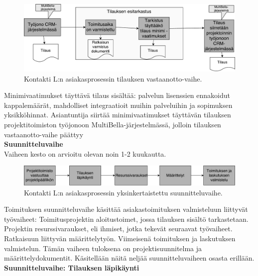 \documentclass[finnish,12pt,a4paper,pdftex]{article}
\begin{document}
\begin{figure}[!h]
    \centering
    \includegraphics[scale=0.4]{images/tilvast.pdf}
    \caption{Kontakti L:n asiakasprosessin tilauksen vastaanotto-vaihe.}
    \label{fig:tilausvast}
\end{figure}

Minimivaatimukset täyttävä tilaus sisältää: palvelun lisenssien ennakoidut kappalemäärät, mahdolliset integraatioit muihin palveluihin ja sopimuksen yksikköhinnat. Asiantuntija siirtää minimivaatimukset täyttävän tilauksen projektitoimiston työjonoon MultiBella-järjestelmässä, jolloin tilauksen vastaanotto-vaihe päättyy\\

\textbf{Suunnitteluvaihe}\\

Vaiheen kesto on arvioitu olevan noin 1-2 kuukautta.\\

\begin{figure}[!h]
    \centering
    \includegraphics[scale=0.35]{images/ykssuunn.pdf}
    \caption{Kontakti L:n asiakasprosessin yksinkertaistettu suunnitteluvaihe.}
    \label{fig:ykssuun}
\end{figure}

Toimituksen suunnitteluvaihe käsittää asiakastoimituksen valmisteluun liittyvät työvaiheet: Toimitusprojektin aloitustoimet, jossa tilauksen sisältö tarkastetaan. Projektin resurssivaraukset, eli ihmiset, jotka tekevät seuraavat työvaiheet. Ratkaisuun liittyvän määrittelytyön. Viimeisenä toimituksen ja laskutuksen valmistelun. Tämän vaiheen tuloksena on projektisuunnitelma ja määrittelydokumentit. Käsitellään näitä neljää suunnitteluvaiheen osasta erillään.\\

\textbf{Suunnitteluvaihe: Tilauksen läpikäynti}\\
\end{document}
